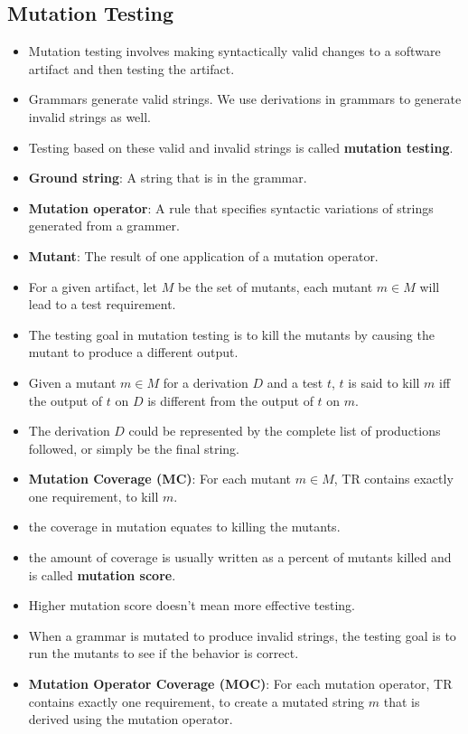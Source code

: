 \documentclass[a4paper]{article}
\begin{document}
\subsection{Mutation Testing}
\begin{itemize}
    \item Mutation testing involves making syntactically valid changes to a software artifact and then testing the artifact.
    \item Grammars generate valid strings. We use derivations in grammars to generate invalid strings as well.
    \item Testing based on these valid and invalid strings is called \textbf{mutation testing}.
    \item \textbf{Ground string}: A string that is in the grammar.
    \item \textbf{Mutation operator}: A rule that specifies syntactic variations of strings generated from a grammer.
    \item \textbf{Mutant}: The result of one application of a mutation operator.
    \item For a given artifact, let $M$ be the set of mutants, each mutant $m\in M$ will lead to a test requirement.
    \item The testing goal in mutation testing is to kill the mutants by causing the mutant to produce a different output.
    \item Given a mutant $m\in M$ for a derivation $D$ and a test $t$, $t$ is said to kill $m$ iff the output of $t$ on $D$ is different from the output of $t$ on $m$.
    \item The derivation $D$ could be represented by the complete list of productions followed, or simply be the final string.
    \item \textbf{Mutation Coverage (MC)}: For each mutant $m\in M$, TR contains exactly one requirement, to kill $m$.
    \item the coverage in mutation equates to killing the mutants.
    \item the amount of coverage is usually written as a percent of mutants killed and is called \textbf{mutation score}.
    \item Higher mutation score doesn't mean more effective testing.
    \item When a grammar is mutated to produce invalid strings, the testing goal is to run the mutants to see if the behavior is correct.
    \item \textbf{Mutation Operator Coverage (MOC)}: For each mutation operator, TR contains exactly one requirement, to create a mutated string $m$ that is derived using the mutation operator.

\end{itemize}
\end{document}
